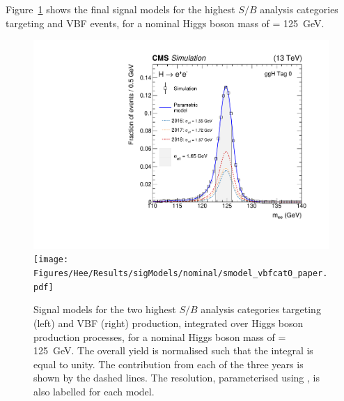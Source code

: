 
Figure~\ref{fig:hee_smodels} shows the final signal models for the highest $S/B$ analysis categories targeting \ggH and VBF events, for a nominal Higgs boson mass of \mH= 125~GeV. 

\begin{figure}[htbp!]
\centering
\includegraphics[width =0.48\linewidth]{Figures/Hee/Results/sigModels/nominal/smodel_gghcat0_paper.pdf}
\texttt{[image: Figures/Hee/Results/sigModels/nominal/smodel\_vbfcat0\_paper.pdf]}
\caption[The signal model for the \ggH Tag 0 and VBF Tag 0 analysis categories.]{Signal models for the two highest $S/B$ analysis categories targeting \ggH (left) and VBF (right) production, integrated over Higgs boson production processes, for a nominal Higgs boson mass of \mH= 125~GeV. The overall yield is normalised such that the integral is equal to unity. The contribution from each of the three years is shown by the dashed lines. The resolution, parameterised using \seff, is also labelled for each model.}
\label{fig:hee_smodels}
\end{figure}

